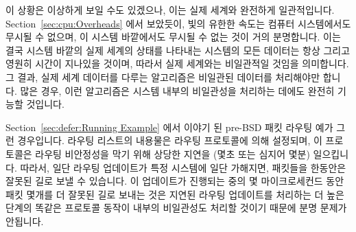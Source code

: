 이 상황은 이상하게 보일 수도 있겠으나, 이는 실제 세계와 완전하게 일관적입니다.
Section~\ref{sec:cpu:Overheads} 에서 보았듯이, 빛의 유한한 속도는 컴퓨터
시스템에서도 무시될 수 없으며, 이 시스템 바깥에서도 무시될 수 없는 것이 거의
분명합니다.
이는 결국 시스템 바깥의 실제 세계의 상태를 나타내는 시스템의 모든 데이터는 항상
그리고 영원히 시간이 지나있을 것이며, 따라서 실제 세계와는 비일관적일 것임을
의미합니다.
그 결과, 실제 세계 데이터를 다루는 알고리즘은 비일관된 데이터를 처리해야만
합니다.
많은 경우, 이런 알고리즘은 시스템 내부의 비일관성을 처리하는 데에도 완전히
기능할 것입니다.

Section~\ref{sec:defer:Running Example}
에서 이야기 된 pre-BSD 패킷 라우팅 예가 그런 경우입니다.
라우팅 리스트의 내용물은 라우팅 프로토콜에 의해 설정되며, 이 프로토콜은 라우팅
비안정성을 막기 위해 상당한 지연을 (몇초 또는 심지어 몇분) 일으킵니다.
따라서, 일단 라우팅 업데이트가 특정 시스템에 일단 가해지면, 패킷들을 한동안은
잘못된 길로 보낼 수 있습니다.
이 업데이트가 진행되는 중의 몇 마이크로세컨드 동안 패킷 몇개를 더 잘못된 길로
보내는 것은 지연된 라우팅 업데이트를 처리하는 더 높은 단계의 똑같은 프로토콜
동작이 내부의 비일관성도 처리할 것이기 때문에 분명 문제가 안됩니다.

